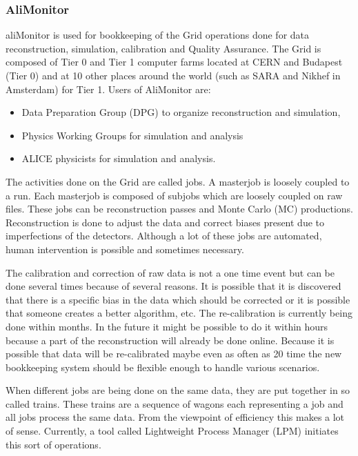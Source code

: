 \subsubsection{AliMonitor}

aliMonitor is used for bookkeeping of the Grid operations done for data reconstruction, simulation, calibration and Quality Assurance.  The Grid is composed of Tier 0 and Tier 1 computer farms located at CERN and Budapest (Tier 0) and at 10 other places around the world (such as SARA and Nikhef in Amsterdam) for Tier 1. Users of AliMonitor are:
\begin{itemize}
  \item Data Preparation Group (DPG) to organize reconstruction and simulation,
  \item Physics Working Groups for simulation and analysis
  \item ALICE physicists for simulation and analysis.
\end{itemize}

The activities done on the Grid are called jobs. A masterjob is loosely coupled to a run. Each masterjob is composed of subjobs which are loosely coupled on raw files. These jobs can be reconstruction passes and Monte Carlo (MC) productions. Reconstruction is done to adjust the data and correct biases present due to imperfections of the detectors. Although a lot of these jobs are automated, human intervention is possible and sometimes necessary.

The calibration and correction of raw data is not a one time event but can be done several times because of several reasons. It is possible that it is discovered that there is a specific bias in the data which should be corrected or it is possible that someone creates a better algorithm, etc. The re-calibration is currently being done within months. In the future it might be possible to do it within hours because a part of the reconstruction will already be done online. Because it is possible that data will be re-calibrated maybe even as often as 20 time the new bookkeeping system should be flexible enough to handle various scenarios.

When different jobs are being done on the same data, they are put together in so called trains. These trains are a sequence of wagons each representing a job and all jobs process the same data. From the viewpoint of efficiency this makes a lot of sense. Currently, a tool called Lightweight Process Manager (LPM) initiates this sort of operations.

